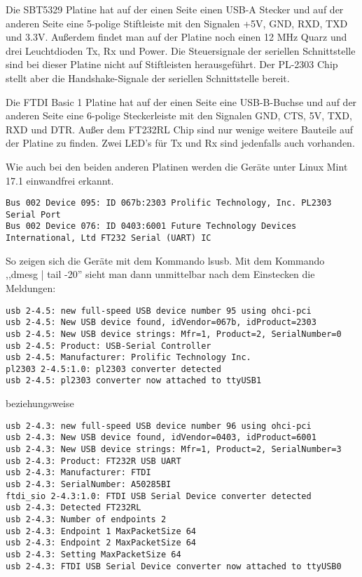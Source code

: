Die SBT5329 Platine hat auf der einen Seite einen USB-A Stecker und auf der anderen Seite eine 5-polige
Stiftleiste mit den Signalen +5V, GND, RXD, TXD und 3.3V. Außerdem findet man auf der Platine noch
einen 12 MHz Quarz und drei Leuchtdioden Tx, Rx und Power. Die Steuersignale der seriellen Schnittstelle
sind bei dieser Platine nicht auf Stiftleisten herausgeführt. 
Der PL-2303 Chip stellt aber die Handshake-Signale der seriellen Schnittstelle bereit.

Die FTDI Basic 1 Platine hat auf der einen Seite eine USB-B-Buchse und auf der anderen Seite eine
6-polige Steckerleiste mit den Signalen GND, CTS, 5V, TXD, RXD und DTR. Außer dem FT232RL Chip sind nur wenige weitere Bauteile auf der Platine zu finden. Zwei LED's für Tx und Rx sind jedenfalls auch vorhanden.

Wie auch bei den beiden anderen Platinen werden die Geräte unter Linux Mint 17.1 einwandfrei erkannt.
\begin{verbatim}
Bus 002 Device 095: ID 067b:2303 Prolific Technology, Inc. PL2303 Serial Port
Bus 002 Device 076: ID 0403:6001 Future Technology Devices International, Ltd FT232 Serial (UART) IC
\end{verbatim}
So zeigen sich die Geräte mit dem Kommando lsusb. Mit dem Kommando ,,dmesg | tail -20'' sieht man dann
unmittelbar nach dem Einstecken die Meldungen:
\begin{verbatim}
usb 2-4.5: new full-speed USB device number 95 using ohci-pci
usb 2-4.5: New USB device found, idVendor=067b, idProduct=2303
usb 2-4.5: New USB device strings: Mfr=1, Product=2, SerialNumber=0
usb 2-4.5: Product: USB-Serial Controller
usb 2-4.5: Manufacturer: Prolific Technology Inc.
pl2303 2-4.5:1.0: pl2303 converter detected
usb 2-4.5: pl2303 converter now attached to ttyUSB1
\end{verbatim}
beziehungsweise
\begin{verbatim}
usb 2-4.3: new full-speed USB device number 96 using ohci-pci
usb 2-4.3: New USB device found, idVendor=0403, idProduct=6001
usb 2-4.3: New USB device strings: Mfr=1, Product=2, SerialNumber=3
usb 2-4.3: Product: FT232R USB UART
usb 2-4.3: Manufacturer: FTDI
usb 2-4.3: SerialNumber: A50285BI
ftdi_sio 2-4.3:1.0: FTDI USB Serial Device converter detected
usb 2-4.3: Detected FT232RL
usb 2-4.3: Number of endpoints 2
usb 2-4.3: Endpoint 1 MaxPacketSize 64
usb 2-4.3: Endpoint 2 MaxPacketSize 64
usb 2-4.3: Setting MaxPacketSize 64
usb 2-4.3: FTDI USB Serial Device converter now attached to ttyUSB0
\end{verbatim}

